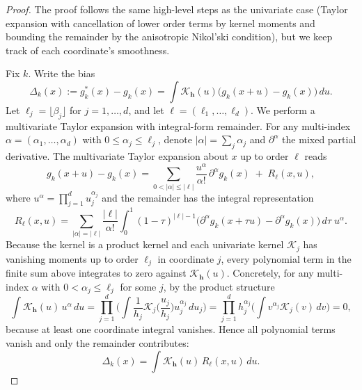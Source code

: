\documentclass[preprint,11pt]{article}
\newcommand{\mcal}{\mathcal}
\numberwithin{equation}{section}
\begin{document}
\begin{proof}
The proof follows the same high-level steps as the univariate case (Taylor expansion with cancellation of lower order terms by kernel moments and bounding the remainder by the anisotropic Nikol'ski condition), but we keep track of each coordinate's smoothness.

Fix $k$. Write the bias
\[
\Delta_k(x):=g_k^*(x)-g_k(x)=\int \mcal{K}_{\mathbf{h}}(u)\big(g_k(x+u)-g_k(x)\big)\,du.
\]
Let $\ell_j=\lfloor\beta_j\rfloor$ for $j=1,\dots,d$, and let $\ell=(\ell_1,\dots,\ell_d)$. We perform a multivariate Taylor expansion with integral-form remainder. For any multi-index $\alpha=(\alpha_1,\dots,\alpha_d)$ with $0\le\alpha_j\le\ell_j$, denote $|\alpha|=\sum_j\alpha_j$ and $\partial^\alpha$ the mixed partial derivative. The multivariate Taylor expansion about $x$ up to order $\ell$ reads
\[
g_k(x+u)-g_k(x)
= \sum_{0<|\alpha|\le|\ell|}
\frac{u^\alpha}{\alpha!}\,\partial^\alpha g_k(x)
\;+\;
R_\ell(x,u),
\]
where $u^\alpha=\prod_{j=1}^d u_j^{\alpha_j}$ and the remainder has the integral representation
\[
R_\ell(x,u)
= \sum_{|\alpha|=|\ell|}
\frac{|\ell|}{\alpha!}\int_0^1 (1-\tau)^{|\ell|-1}
\Big(\partial^\alpha g_k(x+\tau u)-\partial^\alpha g_k(x)\Big)\,d\tau\; u^\alpha .
\]
Because the kernel is a product kernel and each univariate kernel $\mcal{K}_j$ has vanishing moments up to order $\ell_j$ in coordinate \(j\), every polynomial term in the finite sum above integrates to zero against $\mcal{K}_{\mathbf{h}}(u)$. Concretely, for any multi-index $\alpha$ with $0<\alpha_j\le\ell_j$ for some $j$, by the product structure
\[
\int \mcal{K}_{\mathbf{h}}(u)\, u^\alpha\,du
=\prod_{j=1}^d \Big(\int \frac{1}{h_j} \mcal{K}_j\!\Big(\frac{u_j}{h_j}\Big) u_j^{\alpha_j}\,du_j\Big)
= \prod_{j=1}^d h_j^{\alpha_j}\Big(\int v^{\alpha_j}\mcal{K}_j(v)\,dv\Big)=0,
\]
because at least one coordinate integral vanishes. Hence all polynomial terms vanish and only the remainder contributes:
\[
\Delta_k(x)=\int \mcal{K}_{\mathbf{h}}(u)\, R_\ell(x,u)\,du.
\]


\end{proof}
\end{document}
